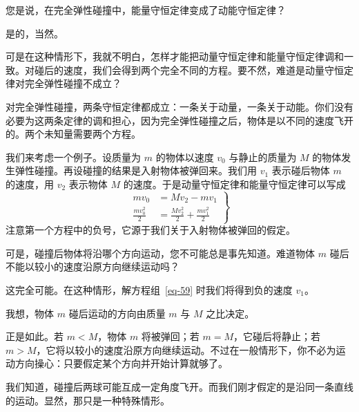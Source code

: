 \begin{dialogue}
\stda 您是说，在完全弹性碰撞中，能量守恒定律变成了动能守恒定律？

\tchr 是的，当然。

\stda 可是在这种情形下，我就不明白，怎样才能把动量守恒定律和能量守恒定律调和一致。对碰后的速度，我们会得到两个完全不同的方程。要不然，难道是动量守恒定律对完全弹性碰撞不成立？

\tchr 对完全弹性碰撞，两条守恒定律都成立：一条关于动量，一条关于动能。你们没有必要为这两条定律的调和担心，因为完全弹性碰撞之后，物体是以不同的速度飞开的。两个未知量需要两个方程。

我们来考虑一个例子。设质量为 $m$ 的物体以速度 $v_{0}$ 与静止的质量为 $M$ 的物体发生弹性碰撞。再设碰撞的结果是入射物体被弹回来。我们用 $v_{1}$ 表示碰后物体 $m$ 的速度，用 $v_{2}$ 表示物体 $M$ 的速度。于是动量守恒定律和能量守恒定律可以写成
\begin{equation}%
\left.
\begin{aligned}
mv_{0} & =Mv_{2}-  mv_{1} \\
\frac{mv_{0}^{2}}{2} & = \frac{Mv_{2}^{2}}{2} + \frac{mv_{1}^{2}}{2}
\label{eq-59}
\end{aligned}
\right\}
\end{equation}
注意第一个方程中的负号，它源于我们关于入射物体被弹回的假定。

\stdb 可是，碰撞后物体将沿哪个方向运动，您不可能总是事先知道。难道物体 $m$ 碰后不能以较小的速度沿原方向继续运动吗？

\tchr 这完全可能。在这种情形，解方程组~\eqref{eq-59} 时我们将得到负的速度 $v_{1}$。

\stdb 我想，物体 $m$ 碰后运动的方向由质量 $m$ 与 $M$ 之比决定。

\tchr 正是如此。若 $m<M$，物体 $m$ 将被弹回；若 $m=M$，它碰后将静止；若 $m>M$，它将以较小的速度沿原方向继续运动。不过在一般情形下，你不必为运动方向操心：只要假定某个方向并开始计算就够了。

\stdb 我们知道，碰撞后两球可能互成一定角度飞开。而我们刚才假定的是沿同一条直线的运动。显然，那只是一种特殊情形。


\end{dialogue}
